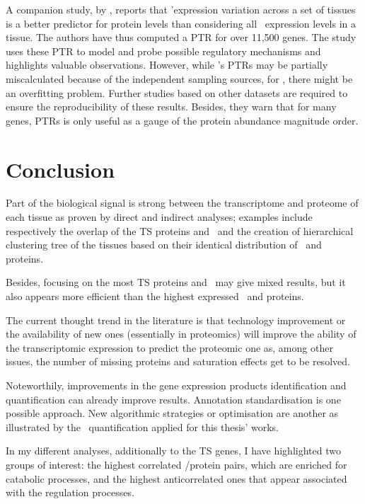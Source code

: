 A companion study, by \citet{Eraslan2019-md}, reports that
\mRNAs{}'expression variation across a set of tissues is
a better predictor for protein levels than
considering all \mRNAs\ expression levels in a tissue.
The authors have thus computed a \gls{PTR} for over 11,500 genes.
The study uses these \gls{PTR} to model and probe possible regulatory mechanisms
and highlights valuable observations.
However, while \citet{Franks2017-bp}'s \glspl{PTR} may be partially miscalculated
because of the independent sampling sources,
for \citet{Eraslan2019-md}, there might be an overfitting problem.
Further studies based on other datasets are required
to ensure the reproducibility of these results.
Besides, they warn that for many genes,
\glspl{PTR} is only useful as a gauge of the protein abundance magnitude order.

\section{Conclusion}

Part of the biological signal is strong
between the transcriptome and proteome of each tissue
as proven by direct and indirect analyses;
examples include respectively the overlap of the \gls{TS} proteins and \mRNAs\
and the creation of hierarchical clustering tree of the tissues based
on their identical distribution of \mRNAs\ and proteins.

Besides, focusing on the most \gls{TS} proteins and \mRNAs\
may give mixed results,
but it also appears more efficient than the highest expressed \mRNAs\ and proteins.

The current thought trend in the literature is that
technology improvement or the availability of new ones
(essentially in proteomics)
will improve the ability of the transcriptomic expression
to predict the proteomic one
as, among other issues,
the number of missing proteins and saturation effects get to be resolved.

Noteworthily, improvements
in the gene expression products identification and quantification can already
improve results.
Annotation standardisation is one possible approach.
New algorithmic strategies or optimisation are another
as illustrated by the \PPKM\ quantification applied for this thesis' works.\mybr\

In my different analyses, additionally to the \gls{TS} genes,
I have highlighted two groups of interest:
the highest correlated \mRNA/protein pairs,
which are enriched for catabolic processes,
and the highest anticorrelated ones
that appear associated with the regulation processes.

